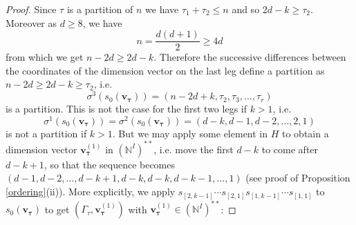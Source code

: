 \documentclass[11pt]{article}
\theoremstyle{definition}
\numberwithin{equation}{section}
\newcommand{\bv}{{\mathbf{v}}}
\newcommand{\N}{{\mathbb{N}}}
\newcommand{\tauhat}{{\boldsymbol \tau}}
\begin{document}
\begin{proof}
	Since $\tau$ is a partition of $n$ we have $\tau_1+\tau_2\leq n$ and so  $2d-k\geq\tau_2$. Moreover as $d\geq 8$, we have
	\begin{equation}
		n=\frac{d(d+1)}{2}\geq 4d
		\label{eq1}\end{equation}
	from which we get $n-2d\geq 2d-k$. Therefore the successive differences between the coordinates of the dimension vector on the last leg define a partition as $n-2d\geq 2d-k\geq\tau_2$, i.e. $$\sigma^3(s_0(\bv_\tauhat))=(n-2d+k,\tau_2, \tau_3, \ldots, \tau_r)$$ is a partition. This is not the case for the first two legs if $k>1$, i.e. $$\sigma^1(s_0(\bv_\tauhat))=\sigma^2(s_0(\bv_\tauhat))=(d-k,d-1,d-2,\ldots , 2,1)$$ is not a partition if $k>1$. But  we may apply some element in $H$ to obtain a dimension vector $\bv^{(1)}_\tauhat$ in $(\N^I)^{**}$, i.e. move the first $d-k$ to come after $d-k+1$, so that the sequence becomes $(d-1,d-2, \ldots , d-k+1,d-k,d-k,d-k-1, \ldots,1)$ (see proof of Proposition \ref{ordering}(ii)).
	More explicitly, we apply $s_{[2,k-1]}\cdots s_{[2,1]}s_{[1,k-1]}\cdots s_{[1,1]}$ to $s_0(\bv_{\tauhat})$ to  get $(\Gamma_\tau,\bv^{(1)}_\tauhat)$ with $\bv^{(1)}_\tauhat\in (\N^I)^{**}$:   
	
	
	
	
	

\end{proof}
\end{document}
